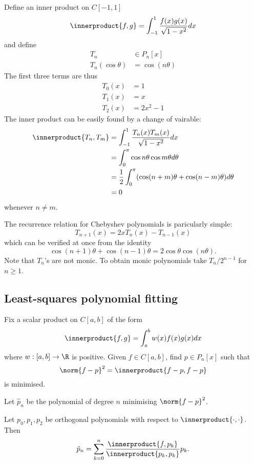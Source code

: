 \documentclass[a4paper]{article}
\newcommand*{\inner}{\innerproduct}
\begin{document}
\begin{eg}
  Define an inner product on \(C[-1, 1]\)
  \[
    \inner{f, g} = \int_{-1}^1 \frac{f(x)g(x)}{\sqrt{1 - x^2}} dx
  \]
  and define
  \begin{align*}
    T_n &\in P_n[x] \\
    T_n(\cos\theta) &= \cos(n\theta)
  \end{align*}
  The first three terms are thus
  \begin{align*}
    T_0(x) &= 1 \\
    T_1(x) &= x \\
    T_2(x) &= 2x^2 - 1
  \end{align*}
  The inner product can be easily found by a change of vairable:
  \begin{align*}
    \inner{T_n, T_m}
    &= \int_{-1}^1 \frac{T_n(x)T_m(x)}{\sqrt{1 - x^2}} dx \\
    &= \int_0^\pi \cos n\theta \cos m\theta d\theta \\
    &= \frac{1}{2} \int_0^\pi (\cos (n + m)\theta + \cos (n - m)\theta) d\theta \\
    &= 0
  \end{align*}
  whenever \(n \neq m\).

  The recurrence relation for Chebyshev polynomials is paricularly simple:
  \[
    T_{n + 1}(x) = 2xT_n(x) - T_{n - 1}(x)
  \]
  which can be verified at once from the identity
  \[
    \cos(n + 1)\theta + \cos(n - 1)\theta = 2\cos \theta \cos (n\theta).
  \]
  Note that \(T_n\)'s are not monic. To obtain monic polynomials take \(T_n/2^{n - 1}\) for \(n \geq 1\).
\end{eg}


\subsection{Least-squares polynomial fitting}

\begin{question}
Fix a scalar product on \(C[a, b]\) of the form
\[
  \inner{f, g} = \int_a^b w(x)f(x)g(x) dx
\]
where \(w: [a, b] \to \R\) is positive. Given \(f \in C[a, b]\), find \(p \in P_n[x]\) such that
  \[
    \norm{f - p}^2 = \inner{f - p, f - p}
  \]
  is minimised.
\end{question}

Let \(\hat p_n\) be the polynomial of degree \(n\) minimising \(\norm{f - p}^2\).

\begin{theorem}
  Let \(p_0, p_1, p_2\) be orthogonal polynomials with respect to \(\inner{\cdot, \cdot}\). Then
  \[
    \hat p_n = \sum_{k = 0}^n \frac{\inner{f, p_k}}{\inner{p_k, p_k}} p_k.
  \]
\end{theorem}
\end{document}
